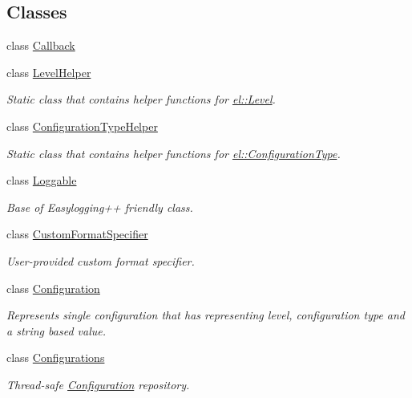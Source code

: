\subsection*{Classes}
\begin{DoxyCompactItemize}
\item 
class \hyperlink{classel_1_1Callback}{Callback}
\item 
class \hyperlink{classel_1_1LevelHelper}{Level\-Helper}
\begin{DoxyCompactList}\small\item\em Static class that contains helper functions for \hyperlink{namespaceel_ab0ac6091262344c52dd2d3ad099e8e36}{el\-::\-Level}. \end{DoxyCompactList}\item 
class \hyperlink{classel_1_1ConfigurationTypeHelper}{Configuration\-Type\-Helper}
\begin{DoxyCompactList}\small\item\em Static class that contains helper functions for \hyperlink{namespaceel_a281f5db6d6163678bc68a8b23b59e124}{el\-::\-Configuration\-Type}. \end{DoxyCompactList}\item 
class \hyperlink{classel_1_1Loggable}{Loggable}
\begin{DoxyCompactList}\small\item\em Base of Easylogging++ friendly class. \end{DoxyCompactList}\item 
class \hyperlink{classel_1_1CustomFormatSpecifier}{Custom\-Format\-Specifier}
\begin{DoxyCompactList}\small\item\em User-\/provided custom format specifier. \end{DoxyCompactList}\item 
class \hyperlink{classel_1_1Configuration}{Configuration}
\begin{DoxyCompactList}\small\item\em Represents single configuration that has representing level, configuration type and a string based value. \end{DoxyCompactList}\item 
class \hyperlink{classel_1_1Configurations}{Configurations}
\begin{DoxyCompactList}\small\item\em Thread-\/safe \hyperlink{classel_1_1Configuration}{Configuration} repository. \end{DoxyCompactList}\item 

\end{DoxyCompactItemize}
